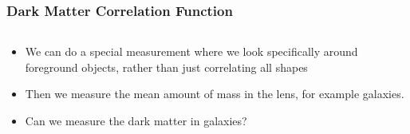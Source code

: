 \documentclass{beamer}
\begin{document}
\frame
{

    \frametitle{Dark Matter Correlation Function}


    \begin{columns}
        \begin{column}{0.5\textwidth}
            \begin{itemize}

                \item We can do a special measurement where we look
                    specifically around foreground objects, rather
                    than just correlating all shapes

                \item Then we measure the mean amount of mass in the lens, for
                    example galaxies.

                \item Can we measure the dark matter in galaxies?

            \end{itemize}


\end{column}
\end{columns}}
\end{document}
